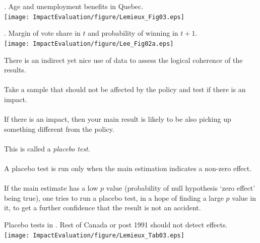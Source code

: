 \begin{frame}{}
\citet{LemieuxMilligan2008}. Age and unemployment benefits in Quebec.\\
\hfil\texttt{[image: ImpactEvaluation/figure/Lemieux\_Fig03.eps]}
\end{frame}
\begin{frame}{}
\citet{Lee2008}. Margin of vote share in $t$ and probability of winning in $t+1$.\\
\hfil\texttt{[image: ImpactEvaluation/figure/Lee\_Fig02a.eps]}
\end{frame}


\begin{frame}{}
There is an indirect yet nice use of data to assess the logical coherence of the results.\\~\\

\pause
Take a sample that should not be affected by the policy and test if there is an impact. \\~\\

\pause
If there is an impact, then your main result is likely to be also picking up something different from the policy.\\~\\

\pause
This is called a \textit{placebo test}.\\~\\

\pause
A placebo test is run only when the main estimation indicates a non-zero effect.\\~\\

\pause
If the main estimate has a low $p$ value (probability of null hypothesis `zero effect' being true), one tries to run a placebo test, in a hope of finding a large $p$ value in it, to get a further confidence that the result is not an accident.
\end{frame}

\begin{frame}[t]{}
Placebo tests in \citet{LemieuxMilligan2008}. Rest of Canada or post 1991 should not detect effects.\\
\hfil\texttt{[image: ImpactEvaluation/figure/Lemieux\_Tab03.eps]}\\
\vspace{-5.65cm}\hspace{3.5cm}\hspace{.9cm}\\
\vspace{2.3cm}\hspace{3.5cm}\hspace{.9cm}
\end{frame}

